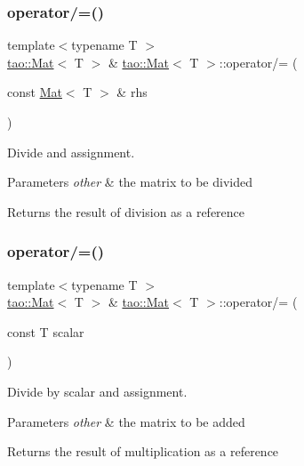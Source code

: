 \subsubsection{\texorpdfstring{operator/=()}{operator/=()}\hspace{0.1cm}{\footnotesize\ttfamily [1/2]}}
{\footnotesize\ttfamily template$<$typename T $>$ \\
\mbox{\hyperlink{classtao_1_1_mat}{tao\+::\+Mat}}$<$ T $>$ \& \mbox{\hyperlink{classtao_1_1_mat}{tao\+::\+Mat}}$<$ T $>$\+::operator/= (\begin{DoxyParamCaption}\item[{const \mbox{\hyperlink{classtao_1_1_mat}{Mat}}$<$ T $>$ \&}]{rhs }\end{DoxyParamCaption})}



Divide and assignment. 


\begin{DoxyParams}{Parameters}
{\em other} & the matrix to be divided \\
\hline
\end{DoxyParams}
\begin{DoxyReturn}{Returns}
the result of division as a reference 
\end{DoxyReturn}
\mbox{\label{classtao_1_1_mat_a2c5e0650cbc59030c4491c439bcd5b28}} 
\subsubsection{\texorpdfstring{operator/=()}{operator/=()}\hspace{0.1cm}{\footnotesize\ttfamily [2/2]}}
{\footnotesize\ttfamily template$<$typename T $>$ \\
\mbox{\hyperlink{classtao_1_1_mat}{tao\+::\+Mat}}$<$ T $>$ \& \mbox{\hyperlink{classtao_1_1_mat}{tao\+::\+Mat}}$<$ T $>$\+::operator/= (\begin{DoxyParamCaption}\item[{const T}]{scalar }\end{DoxyParamCaption})}



Divide by scalar and assignment. 


\begin{DoxyParams}{Parameters}
{\em other} & the matrix to be added \\
\hline
\end{DoxyParams}
\begin{DoxyReturn}{Returns}
the result of multiplication as a reference 
\end{DoxyReturn}
\mbox{\label{classtao_1_1_mat_a81150ed4254e70ab1f3058f159ad2218}} 
